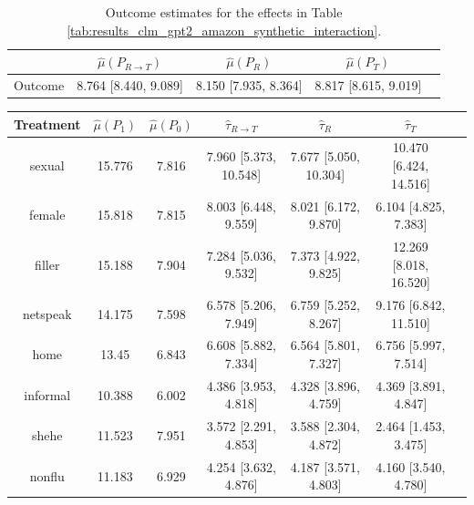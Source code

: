\documentclass{article}
\begin{document}
\begin{table}[!ht]
    \centering
    \begin{tabular}{c|cccc}
\toprule
    & $\hat{\mu}(P_{R \rightarrow T})$   & $\hat{\mu}(P_R)$     & $\hat{\mu}(P_T)$     \\
\midrule
    Outcome & 8.764 [8.440, 9.089]               & 8.150 [7.935, 8.364] & 8.817 [8.615, 9.019] \\
\bottomrule
    \end{tabular}
    \caption{Outcome estimates for the effects in Table \ref{tab:results_clm_gpt2_amazon_synthetic_interaction}.}
    \label{tab:results_clm_gpt2_amazon_synthetic_interaction_outcome}
\end{table}

\begin{table}[!ht]
    \centering
    \begin{tabular}{c|cccccc}
\toprule
    Treatment   &   $\hat{\mu}(P_1)$ &   $\hat{\mu}(P_0)$ & $\hat{\tau}_{R \rightarrow T}$   & $\hat{\tau}_R$        & $\hat{\tau}_T$         \\
\midrule
    sexual      &             15.776 &              7.816 & 7.960 [5.373, 10.548]            & 7.677 [5.050, 10.304] & 10.470 [6.424, 14.516] \\
    female      &             15.818 &              7.815 & 8.003 [6.448, 9.559]             & 8.021 [6.172, 9.870]  & 6.104 [4.825, 7.383]   \\
    filler      &             15.188 &              7.904 & 7.284 [5.036, 9.532]             & 7.373 [4.922, 9.825]  & 12.269 [8.018, 16.520] \\
    netspeak    &             14.175 &              7.598 & 6.578 [5.206, 7.949]             & 6.759 [5.252, 8.267]  & 9.176 [6.842, 11.510]  \\
    home        &             13.45  &              6.843 & 6.608 [5.882, 7.334]             & 6.564 [5.801, 7.327]  & 6.756 [5.997, 7.514]   \\
    informal    &             10.388 &              6.002 & 4.386 [3.953, 4.818]             & 4.328 [3.896, 4.759]  & 4.369 [3.891, 4.847]   \\
    shehe       &             11.523 &              7.951 & 3.572 [2.291, 4.853]             & 3.588 [2.304, 4.872]  & 2.464 [1.453, 3.475]   \\
    nonflu      &             11.183 &              6.929 & 4.254 [3.632, 4.876]             & 4.187 [3.571, 4.803]  & 4.160 [3.540, 4.780]   \\

\end{tabular}
\end{table}
\end{document}
